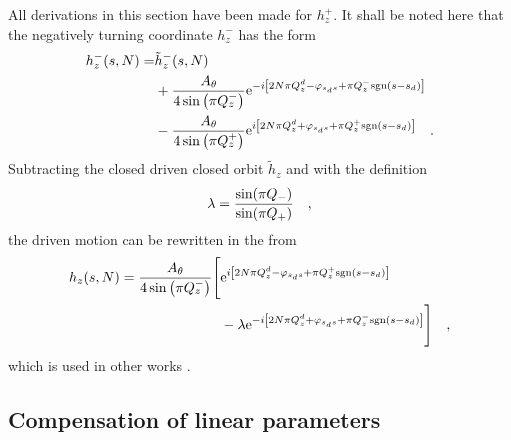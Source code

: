 All derivations in this section have been made for $h_z^+$. It shall be noted here that the negatively turning
coordinate $h_z^-$ has the form
%
\begin{align}
    h_z^-(s, N) =
        &\tilde{h}_z^-(s, N) \notag \\
        &+ \frac{A_\theta}{4\sin\left( \pi Q_z^-\right)}
        \text{e}^{-i\left[2N\pi Q^{d}_{z} - \varphi_{s_ds} + \pi Q_z^-\text{sgn}(s-s_d)\right]} 
        \notag \\
        &- \frac{A_\theta}{4\sin\left( \pi Q_z^+\right)}
        \text{e}^{i\left[2N\pi Q^{d}_{z} + \varphi_{s_ds} + \pi Q_z^+\text{sgn}(s-s_d)\right]} 
    \quad .
    \label{eq_driven_simpl2_minus}
\end{align}
%
Subtracting the closed driven closed orbit $\tilde{h}_z$ and with the definition
%
\begin{equation}
    \lambda = \frac{\sin(\pi Q_-)}{\sin(\pi Q_+)}
    \quad ,
\end{equation}
%
the driven motion can be rewritten in the from
%
\begin{align}
    h_z(s,N) = 
        \frac{A_\theta}{4\sin\left( \pi Q_z^-\right)}
        \Bigg[ 
            &\text{e}^{i\left[2N\pi Q^{d}_{z} - \varphi_{s_ds} + \pi Q_z^+\text{sgn}(s-s_d)\right]} 
            \notag \\
            &- \lambda
            \text{e}^{-i\left[2N\pi Q^{d}_{z} + \varphi_{s_ds} + \pi Q_z^-\text{sgn}(s-s_d)\right]} 
        \Bigg]
    \quad ,
    \label{eq_driven_hz_final}
\end{align}
%
which is used in other works \cite{Miyamoto2008, Miyamoto2010}.


\subsection{Compensation of linear parameters}

